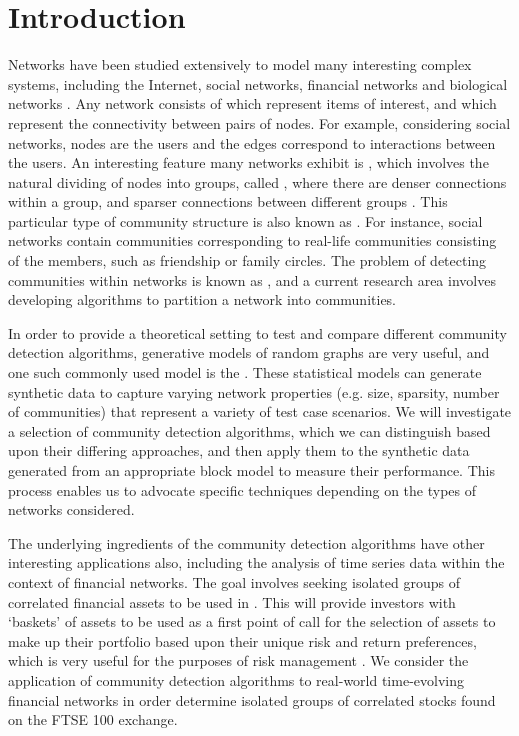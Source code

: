 
\chapter{Introduction}

\label{cha:introduction}


Networks have been studied extensively to model many interesting complex systems, including the Internet, social networks, financial networks and biological networks \cite{New06a,DKM+13,MG13}.
Any network consists of  which represent items of interest, and  which represent the connectivity between pairs of nodes.
For example, considering social networks, nodes are the users and the edges correspond to interactions between the users.
An interesting feature many networks exhibit is , which involves the natural dividing of nodes into groups, called , where there are denser connections within a group, and sparser connections between different groups \cite{New06a,DKM+13,For10,New06b}.
This particular type of community structure is also known as  \cite{DKM+13}.
For instance, social networks contain communities corresponding to real-life communities consisting of the members, such as friendship or family circles.
The problem of detecting communities within networks is known as , and a current research area involves developing algorithms to partition a network into communities.

In order to provide a theoretical setting to test and compare different community detection algorithms, generative models of random graphs are very useful, and one such commonly used model is the  \cite{DKM+13,NN12}.
These statistical models can generate synthetic data to capture varying network properties (e.g. size, sparsity, number of communities) that represent a variety of test case scenarios.
We will investigate a selection of community detection algorithms, which we can distinguish based upon their differing approaches, and then apply them to the synthetic data generated from an appropriate block model to measure their performance.
This process enables us to advocate specific techniques depending on the types of networks considered.

The underlying ingredients of the community detection algorithms have other interesting applications also, including the analysis of time series data within the context of financial networks.
The goal involves seeking isolated groups of correlated financial assets to be used in .
This will provide investors with `baskets' of assets to be used as a first point of call for the selection of assets to make up their portfolio based upon their unique risk and return preferences, which is very useful for the purposes of risk management \cite{MG13}.
We consider the application of community detection algorithms to real-world time-evolving financial networks in order determine isolated groups of correlated stocks found on the FTSE 100 exchange.

